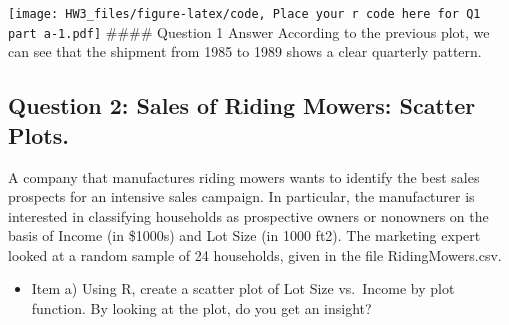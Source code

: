\documentclass[
]{article}
\newenvironment{Shaded}{\begin{snugshade}}{\end{snugshade}}
\newcommand{\AttributeTok}[1]{\textcolor[rgb]{0.77,0.63,0.00}{#1}}
\newcommand{\DecValTok}[1]{\textcolor[rgb]{0.00,0.00,0.81}{#1}}
\newcommand{\FunctionTok}[1]{\textcolor[rgb]{0.00,0.00,0.00}{#1}}
\newcommand{\NormalTok}[1]{#1}
\newcommand{\OtherTok}[1]{\textcolor[rgb]{0.56,0.35,0.01}{#1}}
\newcommand{\SpecialCharTok}[1]{\textcolor[rgb]{0.00,0.00,0.00}{#1}}
\newcommand{\StringTok}[1]{\textcolor[rgb]{0.31,0.60,0.02}{#1}}
\providecommand{\tightlist}{%
  \setlength{\itemsep}{0pt}\setlength{\parskip}{0pt}}
\begin{document}
\begin{Shaded}
\end{Shaded}

\texttt{[image: HW3\_files/figure-latex/code, Place your r code here for Q1 part a-1.pdf]}
\#\#\#\# Question 1 Answer According to the previous plot, we can see
that the shipment from 1985 to 1989 shows a clear quarterly pattern.

\hypertarget{question-2-sales-of-riding-mowers-scatter-plots.}{%
\subsection{Question 2: Sales of Riding Mowers: Scatter
Plots.}\label{question-2-sales-of-riding-mowers-scatter-plots.}}

A company that manufactures riding mowers wants to identify the best
sales prospects for an intensive sales campaign. In particular, the
manufacturer is interested in classifying households as prospective
owners or nonowners on the basis of Income (in \$1000s) and Lot Size (in
1000 ft2). The marketing expert looked at a random sample of 24
households, given in the file RidingMowers.csv.

\begin{itemize}
\tightlist
\item
  Item a) Using R, create a scatter plot of Lot Size vs.~Income by plot
  function. By looking at the plot, do you get an insight?
\end{itemize}
\end{document}
